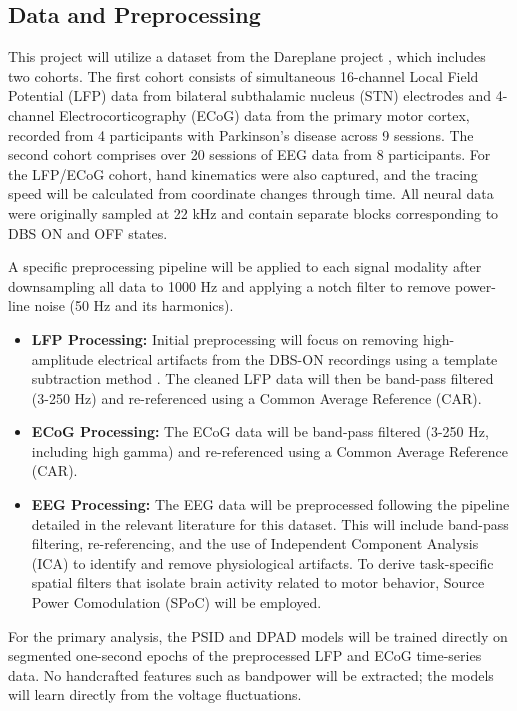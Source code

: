 \documentclass[12pt, a4paper]{article}
\begin{document}
\subsection{Data and Preprocessing}
This project will utilize a dataset from the Dareplane project \parencite{doldLFPECoGData2024}, which includes two cohorts. The first cohort consists of simultaneous 16-channel Local Field Potential (LFP) data from bilateral subthalamic nucleus (STN) electrodes and 4-channel Electrocorticography (ECoG) data from the primary motor cortex, recorded from 4 participants with Parkinson's disease across 9 sessions. The second cohort comprises over 20 sessions of EEG data from 8 participants. For the LFP/ECoG cohort, hand kinematics were also captured, and the tracing speed will be calculated from coordinate changes through time. All neural data were originally sampled at 22 kHz and contain separate blocks corresponding to DBS ON and OFF states.

A specific preprocessing pipeline will be applied to each signal modality after downsampling all data to 1000 Hz and applying a notch filter to remove power-line noise (50 Hz and its harmonics).

\begin{itemize}
    \item \textbf{LFP Processing:} Initial preprocessing will focus on removing high-amplitude electrical artifacts from the DBS-ON recordings using a template subtraction method \parencite{qianMethodRemovalDeep2017,hammerArtifactCharacterizationMultipurpose2022}. The cleaned LFP data will then be band-pass filtered (3-250 Hz) and re-referenced using a Common Average Reference (CAR).

    \item \textbf{ECoG Processing:} The ECoG data will be band-pass filtered (3-250 Hz, including high gamma) and re-referenced using a Common Average Reference (CAR). 

    \item \textbf{EEG Processing:} The EEG data will be preprocessed following the pipeline detailed in the relevant literature for this dataset. This will include band-pass filtering, re-referencing, and the use of Independent Component Analysis (ICA) to identify and remove physiological artifacts. To derive task-specific spatial filters that isolate brain activity related to motor behavior, Source Power Comodulation (SPoC) will be employed.
\end{itemize}

For the primary analysis, the PSID and DPAD models will be trained directly on segmented one-second epochs of the preprocessed LFP and ECoG time-series data. No handcrafted features such as bandpower will be extracted; the models will learn directly from the voltage fluctuations.
\end{document}
